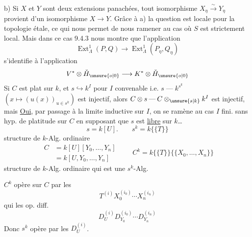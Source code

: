 b) Si $X$ et $Y$ sont deux extensions panachées, tout isomorphisme $X_\eta\xrightarrow{\sim}Y_\eta$ provient d'un isomorphisme $X\longrightarrow Y$. Grâce à a) la question est locale pour la topologie étale, ce qui nous permet de nous ramener au cas où $S$ est strictement local. Mais dans ce cas 9.4.3 nous montre que l'application
\[
\operatorname{Ext}^1_\Lambda(P,Q)\longrightarrow\operatorname{Ext}^1_\Lambda(P_\eta,Q_\eta)
\]
s'identifie à l'application
\[
V^*\otimes\check H_{\unsure{o|0}}\longrightarrow K^*\otimes\check H_{\unsure{o|0}}
\]
Si $C$ est plat sur $k$, et $s\hookrightarrow k^I$ pour $I$ convenable
i.e. $s\mathbin{\text{---}}k^{s^k}$ $(x\longmapsto(u(x))_{u\in s^k})$ est injectif,
alors $C\otimes s\mathbin{\text{---}}C\otimes_{\unsure{s|k}}k^I$ est injectif, mais
\diagram{\[
\begin{array}{rclll}
C\otimes_k k^{(I)}&\longrightarrow&(C\otimes_k k)^I=&C^I&\text{est-il injectif ?}\\
&&&\text{\textquotedbl}&\\
&&&\operatorname{Hom}(k^{(I)},C).&
\end{array}
\]}
\uline{Oui}, par passage à la limite inductive sur $I$, on se ramène au cas $I$ fini\unsure{---}.
 sans hyp. de platitude sur $C$ en supposant que $s$ est \uline{libre} sur $k$\ldots
{}
\[
 s=k[U].\qquad s^k=k\{\{T\}\}
\]
structure de $k$-Alg. ordinaire
\[
 \begin{aligned}
 C&=k[U][Y_0,\ldots,Y_n]\\
  &=k[U,Y_0,\ldots,Y_n]
 \end{aligned}
 \qquad C^k=k\{\{T\}\}\{\{X_0,\ldots,X_n\}\}
\]
structure de $k$-Alg. ordinaire qui est une $s^k$-Alg.

$C^k$ opère sur $C$ par les
\[
 T^{(i)}X_0^{(i_0)}\cdots X_n^{(i_n)}
\]
qui  les op. diff.
\[
 D_U^{(i)}D_{Y_0}^{(i_0)}\cdots D_{Y_n}^{(i_n)}
\]
 Donc $s^k$ opère par les $D_U^{(i)}$.

